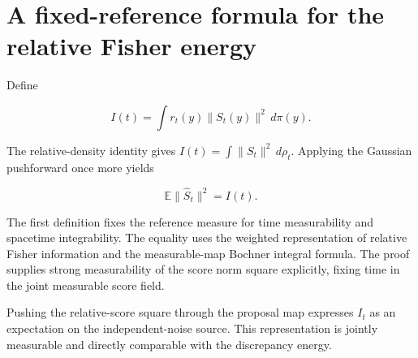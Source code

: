 \documentclass[11pt,a4paper]{article}
\begin{document}
\section{\texorpdfstring{A fixed-reference formula for the relative Fisher energy}{A fixed-reference formula for the relative Fisher energy}}


Define

\[I(t)=\int r_t(y)\|S_t(y)\|^2\,d\pi(y).\]

The relative-density identity gives \(I(t)=\int\|S_t\|^2\,d\rho_t\). Applying the Gaussian pushforward once more yields

\[\mathbb E\|\widehat S_t\|^2=I(t).\]

The first definition fixes the reference measure for time measurability and spacetime integrability. The equality uses the weighted representation of relative Fisher information and the measurable-map Bochner integral formula. The proof supplies strong measurability of the score norm square explicitly, fixing time in the joint measurable score field.



Pushing the relative-score square through the proposal map expresses \(I_t\) as an expectation on the independent-noise source. This representation is jointly measurable and directly comparable with the discrepancy energy.
\end{document}
